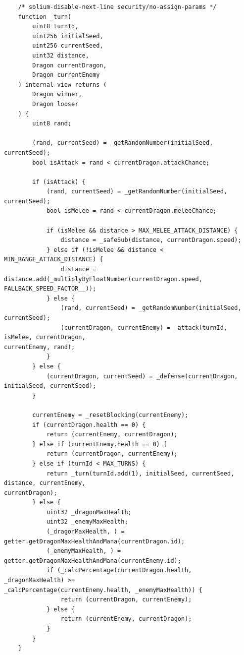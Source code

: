 \documentclass[12pt]{article}
\begin{document}
\begin{footnotesize}
\begin{verbatim}
    /* solium-disable-next-line security/no-assign-params */
    function _turn(
        uint8 turnId,
        uint256 initialSeed,
        uint256 currentSeed,
        uint32 distance,
        Dragon currentDragon,
        Dragon currentEnemy
    ) internal view returns (
        Dragon winner,
        Dragon looser
    ) {
        uint8 rand;

        (rand, currentSeed) = _getRandomNumber(initialSeed, currentSeed);
        bool isAttack = rand < currentDragon.attackChance;

        if (isAttack) {
            (rand, currentSeed) = _getRandomNumber(initialSeed, currentSeed);
            bool isMelee = rand < currentDragon.meleeChance;

            if (isMelee && distance > MAX_MELEE_ATTACK_DISTANCE) {
                distance = _safeSub(distance, currentDragon.speed);
            } else if (!isMelee && distance < MIN_RANGE_ATTACK_DISTANCE) {
                distance = distance.add(_multiplyByFloatNumber(currentDragon.speed, FALLBACK_SPEED_FACTOR__));
            } else {
                (rand, currentSeed) = _getRandomNumber(initialSeed, currentSeed);
                (currentDragon, currentEnemy) = _attack(turnId, isMelee, currentDragon, 
currentEnemy, rand);
            }
        } else {
            (currentDragon, currentSeed) = _defense(currentDragon, initialSeed, currentSeed);
        }

        currentEnemy = _resetBlocking(currentEnemy);
        if (currentDragon.health == 0) {
            return (currentEnemy, currentDragon);
        } else if (currentEnemy.health == 0) {
            return (currentDragon, currentEnemy);
        } else if (turnId < MAX_TURNS) {
            return _turn(turnId.add(1), initialSeed, currentSeed, distance, currentEnemy, 
currentDragon);
        } else {
            uint32 _dragonMaxHealth;
            uint32 _enemyMaxHealth;
            (_dragonMaxHealth, ) = getter.getDragonMaxHealthAndMana(currentDragon.id);
            (_enemyMaxHealth, ) = getter.getDragonMaxHealthAndMana(currentEnemy.id);
            if (_calcPercentage(currentDragon.health, _dragonMaxHealth) >= 
_calcPercentage(currentEnemy.health, _enemyMaxHealth)) {
                return (currentDragon, currentEnemy);
            } else {
                return (currentEnemy, currentDragon);
            }
        }
    }

\end{verbatim}
\end{footnotesize}


\vspace{\baselineskip}

\vspace{\baselineskip}



\end{document}

